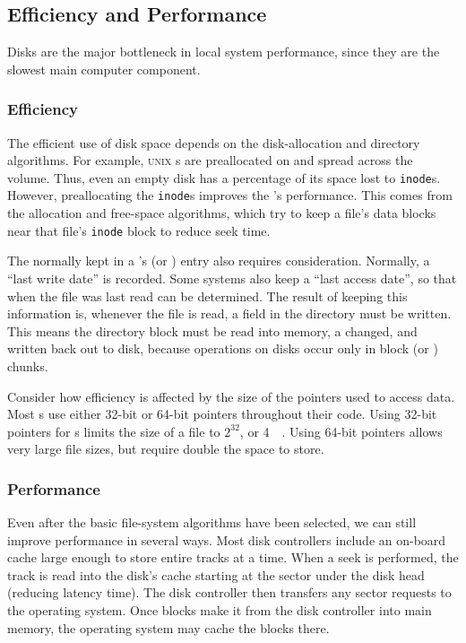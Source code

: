 \subsection{Efficiency and Performance}\label{subsec:Efficiency_Performance}
Disks are the major bottleneck in local system performance, since they are the slowest main computer component.

\subsubsection{Efficiency}\label{subsubsec:Efficiency}
The efficient use of disk space depends on the disk-allocation and directory algorithms.
For example, \textsc{unix} s are preallocated on and spread across the volume.
Thus, even an empty disk has a percentage of its space lost to \texttt{inode}s.
However, preallocating the \texttt{inode}s improves the 's performance.
This comes from the allocation and free-space algorithms, which try to keep a file’s data blocks near that file’s \texttt{inode} block to reduce seek time.

The  normally kept in a 's  (or ) entry also requires consideration.
Normally, a ``last write date'' is recorded.
Some systems also keep a ``last access date'', so that when the file was last read can be determined.
The result of keeping this information is, whenever the file is read, a field in the directory must be written.
This means the directory block must be read into memory, a changed, and written back out to disk, because operations on disks occur only in block (or ) chunks.

Consider how efficiency is affected by the size of the pointers used to access data.
Most s use either 32-bit or 64-bit pointers throughout their code.
Using 32-bit pointers for s limits the size of a file to $2^{32}$, or \SI{4}{\gibi{} \byte{}}.
Using 64-bit pointers allows very large file sizes, but require double the space to store.

\subsubsection{Performance}\label{subsubsec:Performance}
Even after the basic file-system algorithms have been selected, we can still improve performance in several ways.
Most disk controllers include an on-board cache large enough to store entire tracks at a time.
When a seek is performed, the track is read into the disk's cache starting at the sector under the disk head (reducing latency time).
The disk controller then transfers any sector requests to the operating system.
Once blocks make it from the disk controller into main memory, the operating system may cache the blocks there.


